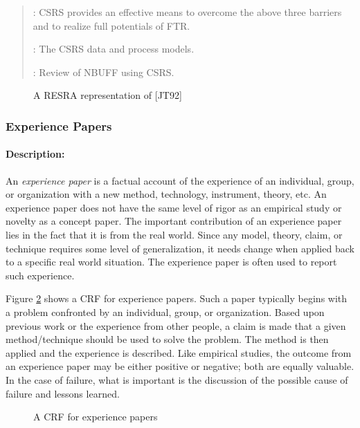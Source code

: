 \begin{itemize}
{\begin{quotation}
  : CSRS provides an effective means to overcome the
  above three barriers and to realize full potentials of FTR.
  
  : The CSRS data and process models.

  : Review of NBUFF using CSRS.
\end{quotation}
\normalsize

\begin{figure}[htb]
  \caption{A RESRA representation of [JT92]} 
  \label{fig:johnson}
\end{figure}


\subsubsection{Experience Papers}

\paragraph{Description:}

An {\it experience paper\/} is a factual account of the experience of an
individual, group, or organization with a new method, technology,
instrument, theory, etc. An experience paper does not have the same level
of rigor as an empirical study or novelty as a concept paper. The important
contribution of an experience paper lies in the fact that it is from the
real world. Since any model, theory, claim, or technique requires some
level of generalization, it needs change when applied back to a specific
real world situation. The experience paper is often used to report such
experience.

Figure \ref{fig:experience-crf} shows a CRF for experience papers. Such a
paper typically begins with a problem confronted by an individual, group,
or organization. Based upon previous work or the experience from other
people, a claim is made that a given method/technique should be used to
solve the problem. The method is then applied and the experience is
described. Like empirical studies, the outcome from an experience paper may
be either positive or negative; both are equally valuable. In the case of
failure, what is important is the discussion of the possible cause of
failure and lessons learned.

\begin{figure}[htb]
  \caption{A CRF for experience papers} 
  \label{fig:experience-crf}
\end{figure}


}
\end{itemize}
